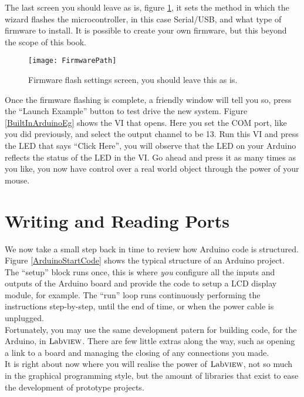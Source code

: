 The last screen you should leave as is, figure \ref{FirmwareConf}, it sets the method in which the wizard flashes the microcontroller, in this case Serial/USB, and what type of firmware to install. It is possible to create your own firmware, but this beyond the scope of this book.\\
\begin{figure}
	\centering
	\texttt{[image: FirmwarePath]}
	\caption{Firmware flash settings screen, you should leave this as is.}
	\label{FirmwareConf}
\end{figure}

Once the firmware flashing is complete, a friendly window will tell you so, press the ``Launch Example'' button to test drive the new system. Figure \ref{BuiltInArduinoEg} shows the VI that opens. %
 Here you set the COM port, like you did previously, and select the output channel to be 13. Run this VI and press the LED that says ``Click Here'', you will observe that the LED on your Arduino reflects the status of the LED in the VI. Go ahead and press it as many times as you like, you now have control over a real world object through the power of your mouse.
 
\section{Writing and Reading Ports}
We now take a small step back in time to review how Arduino code is structured. Figure \ref{ArduinoStartCode} shows the typical structure of an Arduino project. The ``setup'' block runs once, this is where \textit{you} configure all the inputs and outputs of the Arduino board and provide the code to setup a LCD display module, for example. The ``run'' loop runs continuously %
performing the instructions step-by-step, until the end of time, or when the power cable is unplugged.\\

Fortunately, you may use the same development patern for building code, for the Arduino, in $\text{Lab}\textsc{view}$. There are few little extras along the way, such as opening a link to a board and managing the closing of any connections you made.\\

It is right about now where you will realise the power of $\text{Lab}\textsc{view}$, not so much in the graphical programming style, but the amount of libraries that exist to ease the development of prototype projects.\\

